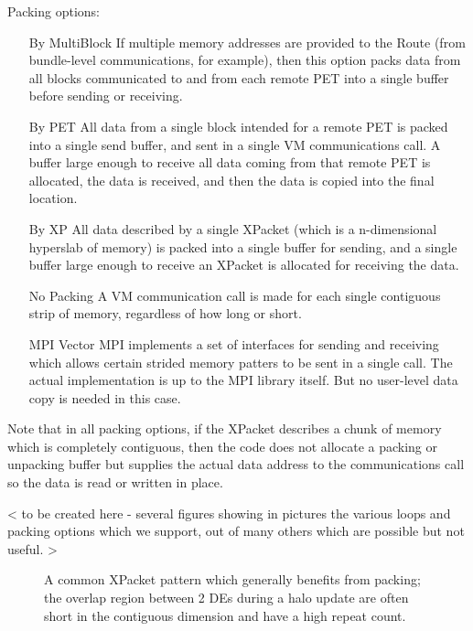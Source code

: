 \begin{enumerate}
Packing options:
\begin{enumerate}
\item[By MultiBlock]
If multiple memory addresses are provided to the Route (from
bundle-level communications, for example), then this option
packs data from all blocks communicated to and from each
remote PET into a single buffer before sending or receiving.
\item[By PET]
All data from a single block
intended for a remote PET is packed into a single send
buffer, and sent in a single VM communications call.  
A buffer large enough to receive all data 
coming from that remote PET is allocated, the data is received,
and then the data is copied into the final location.
\item[By XP]
All data described by a single XPacket (which is a n-dimensional
hyperslab of memory) is packed into a single buffer for sending,
and a single buffer large enough to receive an XPacket is 
allocated for receiving the data.
\item[No Packing]
A VM communication call is made for each single contiguous strip
of memory, regardless of how long or short.
\item[MPI Vector]
MPI implements a set of interfaces for sending and receiving which
allows certain strided memory patters to be sent in a single call.
The actual implementation is up to the MPI library itself.  But no
user-level data copy is needed in this case.
\end{enumerate}
Note that in all packing options, if the XPacket describes a
chunk of memory which is completely contiguous, then the code
does not allocate a packing or unpacking buffer but supplies the
actual data address to the communications call so the data is
read or written in place.

< to be created here - several figures showing in pictures
the various loops and packing options which we support,
out of many others which are possible but not useful. >

\begin{center}
\begin{figure}
\caption{A common XPacket pattern which generally benefits from
packing; the overlap region between 2 DEs during a halo update
are often short in the contiguous dimension and have a high 
repeat count.}
\label{fig:xpacketpack}
\end{figure}
\end{center}


\end{enumerate}
